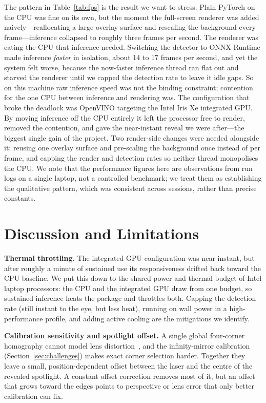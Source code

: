 \documentclass[conference]{IEEEtran}
\begin{document}
The pattern in Table~\ref{tab:fps} is the result we want to stress. Plain PyTorch
on the CPU was fine on its own, but the moment the full-screen renderer was added
naively---reallocating a large overlay surface and rescaling the background every
frame---inference collapsed to roughly three frames per second. The renderer was
eating the CPU that inference needed. Switching the detector to ONNX Runtime made
inference \emph{faster} in isolation, about 14 to 17 frames per second, and yet the
system felt worse, because the now-faster inference thread ran flat out and starved
the renderer until we capped the detection rate to leave it idle gaps. So on this
machine raw inference speed was not the binding constraint; contention for the one
CPU between inference and rendering was. The configuration that broke the deadlock
was OpenVINO targeting the Intel Iris Xe integrated GPU. By moving inference off
the CPU entirely it left the processor free to render, removed the contention, and
gave the near-instant reveal we were after---the biggest single gain of the
project. Two render-side changes were needed alongside it: reusing one overlay
surface and pre-scaling the background once instead of per frame, and capping the
render and detection rates so neither thread monopolises the CPU. We note that the
performance figures here are observations from run logs on a single laptop, not a
controlled benchmark; we treat them as establishing the qualitative pattern, which
was consistent across sessions, rather than precise constants.

\section{Discussion and Limitations}\label{sec:discussion}
\noindent\textbf{Thermal throttling.} The integrated-GPU configuration was
near-instant, but after roughly a minute of sustained use its responsiveness
drifted back toward the CPU baseline. We put this down to the shared power and
thermal budget of Intel laptop processors: the CPU and the integrated GPU draw from
one budget, so sustained inference heats the package and throttles both. Capping
the detection rate (still instant to the eye, but less heat), running on wall power
in a high-performance profile, and adding active cooling are the mitigations we
identify.

\noindent\textbf{Calibration sensitivity and spotlight offset.} A single global
four-corner homography cannot model lens distortion~\cite{moreno2012}, and the
infinity-mirror calibration (Section~\ref{sec:challenges}) makes exact corner
selection harder. Together they leave a small, position-dependent offset between
the laser and the centre of the revealed spotlight. A constant offset correction
removes most of it, but an offset that grows toward the edges points to
perspective or lens error that only better calibration can fix.
\end{document}
